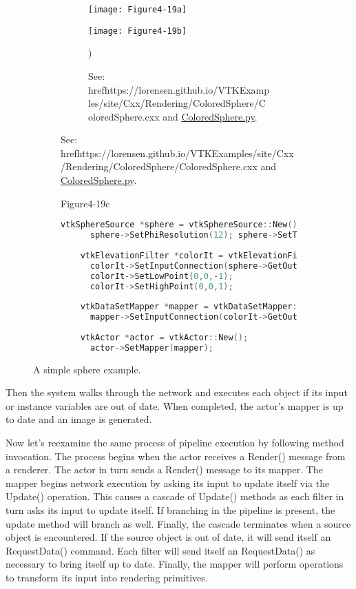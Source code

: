 \begin{figure}[htb]
    \centering
    \begin{subfigure}[h]{0.96\linewidth}
        \begin{subfigure}[h]{0.48\linewidth}
        \texttt{[image: Figure4-19a]}
        \caption*{}
        \label{fig:Figure4-19a}
        \end{subfigure}
        \hfill
        \begin{subfigure}[h]{0.48\linewidth}
        \texttt{[image: Figure4-19b]}
        \caption*{See: href{https://lorensen.github.io/VTKExamples/site/Cxx/Rendering/ColoredSphere/}{ColoredSphere.cxx} and \href{https://lorensen.github.io/VTKExamples/site/Python/Rendering/ColoredSphere/}{ColoredSphere.py}.})
        \label{fig:Figure4-19b}
        \end{subfigure}
  \end{subfigure}
  \hfill
  \begin{subfigure}[h]{0.76\linewidth}{Figure4-19c}
  \begin{lstlisting}[language=C++,  caption={}, numbers=none, frame=none]
    vtkSphereSource *sphere = vtkSphereSource::New();
      sphere->SetPhiResolution(12); sphere->SetThetaResolution(12);
    
    vtkElevationFilter *colorIt = vtkElevationFilter::New();
      colorIt->SetInputConnection(sphere->GetOutputPort());
      colorIt->SetLowPoint(0,0,-1);
      colorIt->SetHighPoint(0,0,1);
    
    vtkDataSetMapper *mapper = vtkDataSetMapper::New();
      mapper->SetInputConnection(colorIt->GetOutputPort());
      
    vtkActor *actor = vtkActor::New();
      actor->SetMapper(mapper);
    \end{lstlisting} 
    \caption*{}
  \end{subfigure}
  \caption{A simple sphere example.}\label{fig:Figure4-19}
\end{figure}

Then the system walks through the network and executes each object if its input or instance variables are out of date. When completed, the actor's mapper is up to date and an image is generated.

Now let's reexamine the same process of pipeline execution by following method invocation. The process begins when the actor receives a Render() message from a renderer. The actor in turn sends a Render() message to its mapper. The mapper begins network execution by asking its input to update itself via the Update() operation. This causes a cascade of Update() methods as each filter in turn asks its input to update itself. If branching in the pipeline is present, the update method will branch as well. Finally, the cascade terminates when a source object is encountered. If the source object is out of date, it will send itself an RequestData() command. Each filter will send itself an RequestData() as necessary to bring itself up to date. Finally, the mapper will perform operations to transform its input into rendering primitives.


